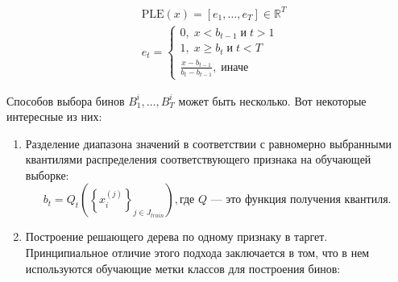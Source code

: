 \documentclass[12pt]{article}
\begin{document}
\vspace{-3mm}
\begin{align}
&\text{PLE}(x) = [e_1, \ldots, e_T] \in \mathbb{R}^T \\
&e_t = 
\begin{cases} 
0, \; x < b_{t-1} \; \text{и} \; t > 1 \\
1, \; x \geq b_t \; \text{и} \; t < T \\
\frac{x-b_{t-1}}{b_t-b_{t-1}}, \; \text{иначе} 
\end{cases}
\end{align}

\noindent Способов выбора бинов $B^i_1, \ldots, B^i_T$ может быть несколько. Вот некоторые интересные из них:

\begin{enumerate}
    \item Разделение диапазона значений в соответствии с равномерно выбранными квантилями распределения соответствующего признака на обучающей выборке:
    \begin{equation}
        b_t = Q_t \left(\left\{ x_i^{(j)} \right\}_{j \in J_{train}}\right), \text{где \(Q\) — это функция получения квантиля. }
    \end{equation}

    \item Построение решающего дерева по одному признаку в таргет. Принципиальное отличие этого подхода заключается в том, что в нем используются обучающие метки классов для построения бинов:

    
\end{enumerate}
\end{document}
